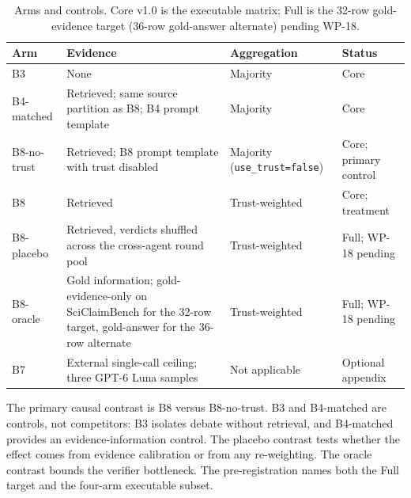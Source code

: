 \begin{table}[H]
  \centering
  \caption{Arms and controls. Core v1.0 is the executable matrix; Full is the 32-row gold-evidence target (36-row gold-answer alternate) pending WP-18.}
  \renewcommand{\arraystretch}{1.25}
  \small
  \begin{tabular}{|p{}|p{}|p{}|p{}|}
    \hline
    Arm & Evidence & Aggregation & Status \\
    \hline
    B3 & None & Majority & Core \\
    \hline
    B4-matched & Retrieved; same source partition as B8; B4 prompt template & Majority & Core \\
    \hline
    B8-no-trust & Retrieved; B8 prompt template with trust disabled & Majority (\texttt{use\_trust=false}) & Core; primary control \\
    \hline
    B8 & Retrieved & Trust-weighted & Core; treatment \\
    \hline
    B8-placebo & Retrieved, verdicts shuffled across the cross-agent round pool & Trust-weighted & Full; WP-18 pending \\
    \hline
    B8-oracle & Gold information; gold-evidence-only on SciClaimBench for the 32-row target, gold-answer for the 36-row alternate & Trust-weighted & Full; WP-18 pending \\
    \hline
    B7 & External single-call ceiling; three GPT-6 Luna samples & Not applicable & Optional appendix \\
    \hline
  \end{tabular}
  \label{tab:arms}
\end{table}

The primary causal contrast is B8 versus B8-no-trust. B3 and B4-matched are controls, not competitors: B3 isolates debate without retrieval, and B4-matched provides an evidence-information control. The placebo contrast tests whether the effect comes from evidence calibration or from any re-weighting. The oracle contrast bounds the verifier bottleneck. The pre-registration names both the Full target and the four-arm executable subset.

